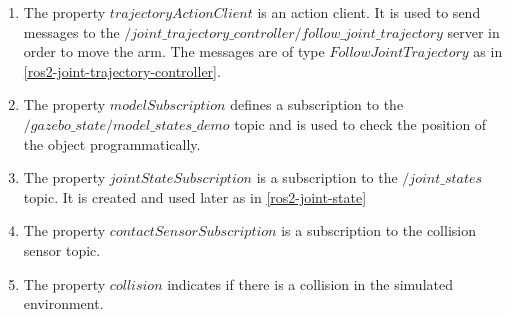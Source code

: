 \documentclass[12pt,oneside]{article}
\begin{document}
\begin{enumerate}
\item\label{env-manager:trajectory-action-client} The property $trajectoryActionClient$ is an action client. It is used to send messages to the $/joint\_trajectory\_controller/follow\_joint\_trajectory$ server in order to move the arm. The messages are of type $FollowJointTrajectory$ as in \ref{ros2-joint-trajectory-controller}.
\item\label{env-manager:model-subscription} The property $modelSubscription$ defines a subscription to the \\ $/gazebo\_state/model\_states\_demo$ topic and is used to check the position of the object programmatically.
\item\label{env-manager:joint-state-subscription} The property $jointStateSubscription$ is a subscription to the $/joint\_states$ topic. It is created and used later as in \ref{ros2-joint-state}
\item The property $contactSensorSubscription$ is a subscription to the collision sensor topic. 
\item The property $collision$ indicates if there is a collision in the simulated environment.
\end{enumerate}
\end{document}
